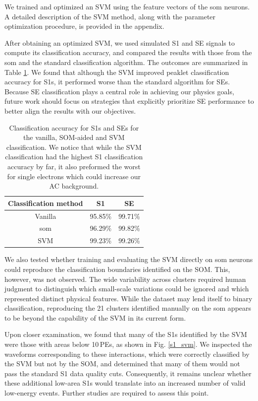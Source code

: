 We trained and optimized an SVM using the feature vectors of the \acrshort{som} neurons. A detailed description of the SVM method, along with the parameter optimization procedure, is provided in the appendix.

After obtaining an optimized SVM, we used simulated S1 and SE signals to compute its classification accuracy, and compared the results with those from the \acrshort{som} and the standard classification algorithm. The outcomes are summarized in Table \ref{svm_result_table}. We found that although the SVM improved peaklet classification accuracy for S1s, it performed worse than the standard algorithm for SEs. Because SE classification plays a central role in achieving our physics goals, future work should focus on strategies that explicitly prioritize SE performance to better align the results with our objectives.

\begin{table}[]
    \centering
    \begin{tabular}{|c|c|c|}
    \hline
          Classification method & S1 & SE \\
         \hline
         Vanilla & 95.85\% & 99.71\% \\
         \hline
         \acrshort{som} & 96.29\% & 99.82\%  \\
         \hline
         SVM & 99.23\% & 99.26\%  \\
         \hline
    \end{tabular}
    \caption{Classification accuracy for S1s and SEs for the vanilla, SOM-aided and SVM classification. We notice that while the SVM classification had the highest S1 classification accuracy by far, it also preformed the worst for single electrons which could increase our AC background.}
    \label{svm_result_table}
\end{table}

We also tested whether training and evaluating the SVM directly on \acrshort{som} neurons could reproduce the classification boundaries identified on the SOM. This, however, was not observed. The wide variability across clusters required human judgment to distinguish which small-scale variations could be ignored and which represented distinct physical features. While the dataset may lend itself to binary classification, reproducing the 21 clusters identified manually on the \acrshort{som} appears to be beyond the capability of the SVM in its current form.

Upon closer examination, we found that many of the S1s identified by the SVM were those with areas below 10\,PEs, as shown in Fig. \ref{s1_svm}. We inspected the waveforms corresponding to these interactions, which were correctly classified by the SVM but not by the SOM, and determined that many of them would not pass the standard S1 data quality cuts. Consequently, it remains unclear whether these additional low-area S1s would translate into an increased number of valid low-energy events. Further studies are required to assess this point.

